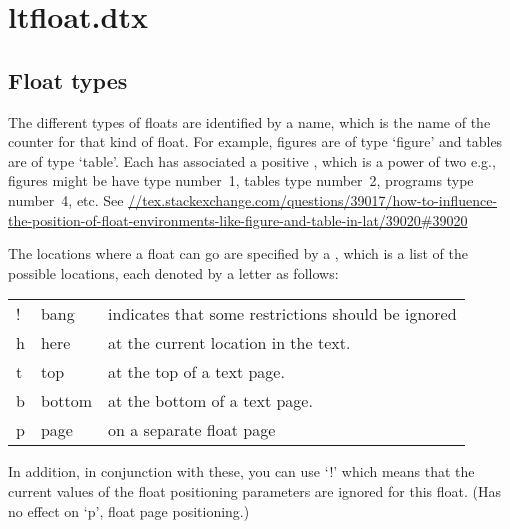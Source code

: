 \long{}

\chapter{ltfloat.dtx}
\label{kernel:ltfloat}
\section{Float types}

  The different types of floats are identified by a  name,
  which is the name of the counter for that kind of float.  For
  example, figures are of type `figure' and tables are of type `table'.
  Each  has associated a positive , which
  is a power of two e.g.,\\
  figures might be have type number~1, tables type number~2, programs
  type number~4, etc. See \url{//tex.stackexchange.com/questions/39017/how-to-influence-the-position-of-float-environments-like-figure-and-table-in-lat/39020#39020}

  The locations where a float can go are specified by a
  , which is a list of the possible
  locations, each denoted by a letter as follows:

    \begin{center}
    \begin{tabular}{l@{ : }l@{ --- }l}
     ! & bang   & indicates that some restrictions should be ignored\\
     h & here   & at the current location in the text.\\
     t & top    & at the top of a text page.\\
     b & bottom & at the bottom of a text page.\\
     p & page   & on a separate float page\\
    \end{tabular}
    \end{center}

  In addition, in conjunction with these, you can use `!' which means
  that the current values of the float positioning parameters are
  ignored for this float. (Has no effect on `p', float page
  positioning.)
  
